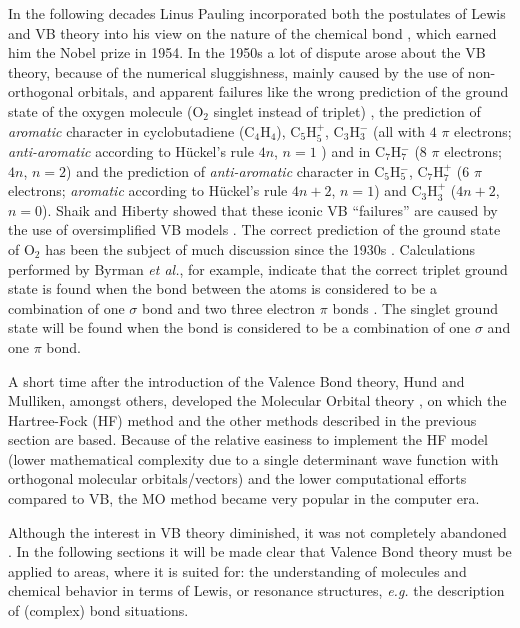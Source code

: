In the following decades Linus Pauling incorporated both the postulates of Lewis and VB theory into his view on the nature of the chemical bond \cite{pauling1,pauling2,pauling3,pauling4,pauling5,pauling6,pauling7,paulingbook}, which earned him the Nobel prize in 1954. In the 1950s a lot of dispute arose about the VB theory, because of the numerical sluggishness, mainly caused by the use of non-orthogonal orbitals, and apparent failures like the wrong prediction of the ground state of the oxygen molecule (O$_2$ singlet instead of triplet) \cite{carsten}, the prediction of \textit{aromatic} character in cyclobutadiene (C$_4$H$_4$), C$_5$H$_{5}^{+}$, C$_3$H$_{3}^{-}$ (all with $4$ $\pi$ electrons; \textit{anti-aromatic} according to H\"{u}ckel's rule $4n$, $n=1$ \cite{march}) and in C$_7$H$_{7}^{-}$ (8 $\pi$ electrons; $4n$, $n=2$) and the prediction of \textit{anti-aromatic} character in C$_5$H$_{5}^{-}$, C$_7$H$_{7}^{+}$ (6 $\pi$ electrons; \textit{aromatic} according to H\"{u}ckel's rule $4n+2$, $n=1$) and C$_3$H$_{3}^{+}$ ($4n+2$, $n=0$). Shaik and Hiberty showed that these iconic VB ``failures'' are caused by the use of oversimplified VB models \cite{antibrush}. The correct prediction of the ground state of O$_2$ has been the subject of much discussion since the 1930s \cite{o2_1,o2_2,o2_3,o2_4,o2_5,o2_6,o2_7,o2_8,o2_9,carsten}. Calculations performed by Byrman \textit{et al.}, for example, indicate that the correct triplet ground state is found when the bond between the atoms is considered to be a combination of one $\sigma$ bond and two three electron $\pi$ bonds \cite{carsten}. The singlet ground state will be found when the bond is considered to be a combination of one $\sigma$ and one $\pi$ bond.

A short time after the introduction of the Valence Bond theory, Hund and Mulliken, amongst others, developed the Molecular Orbital theory \cite{hund,mulliken}, on which the Hartree-Fock (HF) method and the other methods described in the previous section are based. Because of the relative easiness to implement the HF model (lower mathematical complexity due to a single determinant wave function with orthogonal molecular orbitals/vectors) and the lower computational efforts compared to VB, the MO method became very popular in the computer era.

Although the interest in VB theory diminished, it was not completely abandoned \cite{vboverv1,vboverv2,vboverv3}. In the following sections it will be made clear that Valence Bond theory must be applied to areas, where it is suited for: the understanding of molecules and chemical behavior in terms of Lewis, or resonance structures, \textit{e.g.} the description of (complex) bond situations.

